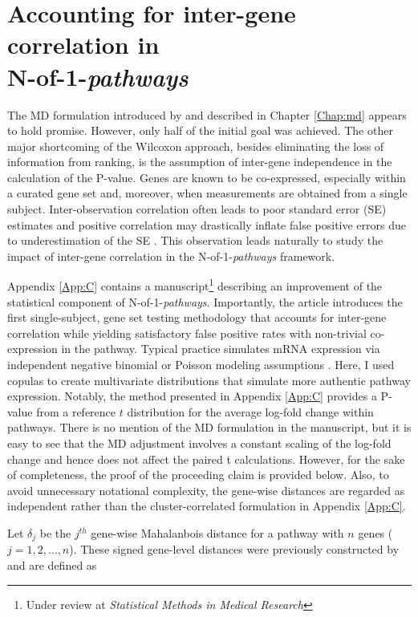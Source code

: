 \chapter{Accounting for inter-gene correlation in\\N-of-1-\emph{pathways}} \label{Chap:ct}

\indent \indent The MD formulation introduced by \citet{Schissler2015} and described in Chapter \ref{Chap:md} appears to hold promise. However, only half of the initial goal was achieved. The other major shortcoming of the Wilcoxon approach, besides eliminating the loss of information from ranking, is the assumption of inter-gene independence in the calculation of the P-value. Genes are known to be co-expressed, especially within a curated gene set \citep{Tamayo2016} and, moreover, when measurements are obtained from a single subject. Inter-observation correlation often leads to poor standard error (SE) estimates and positive correlation may drastically inflate false positive errors due to underestimation of the SE \citep{Wu2012}. This observation leads naturally to study the impact of inter-gene correlation in the N-of-1-\emph{pathways} framework.

Appendix \ref{App:C} contains a manuscript\footnote{Under review at \emph{Statistical Methods in Medical Research}} describing an improvement of the statistical component of N-of-1-\emph{pathways}. Importantly, the article introduces the first single-subject, gene set testing methodology that accounts for inter-gene correlation while yielding satisfactory false positive rates with non-trivial co-expression in the pathway. Typical practice simulates mRNA expression via independent negative binomial or Poisson modeling assumptions \citep{Gardeux2014}. Here, I used copulas \citep{Genest2007,Yan2007} to create multivariate distributions that simulate more authentic pathway expression. Notably, the method presented in Appendix \ref{App:C} provides a P-value from a reference $t$ distribution for the average log-fold change within pathways. There is no mention of the MD formulation in the manuscript, but it is easy to see that the MD adjustment involves a constant scaling of the log-fold change and hence does not affect the paired t calculations.  However, for the sake of completeness, the proof of the proceeding claim is provided below. Also, to avoid unnecessary notational complexity, the gene-wise distances are regarded as independent rather than the cluster-correlated formulation in Appendix \ref{App:C}.

Let $\delta_{j}$ be the $j^{th}$ gene-wise Mahalanbois distance for a pathway with $n$ genes ($j = 1,2,\ldots,n$). These signed gene-level distances were previously constructed by \citet{Schissler2015} and are defined as

